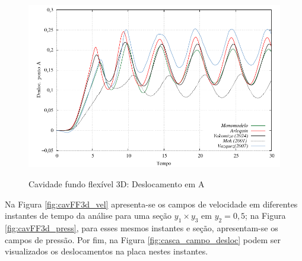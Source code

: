 \begin{figure}[H]
	\caption{Cavidade fundo flexível 3D: Deslocamento em A}
	\centering 
	\includegraphics[scale=0.75,trim=0cm 0cm 0cm 0cm, clip=true]{Imagens/Cap7/cavFF3d_deslA.pdf}	
	\label{fig:cavFF3d_deslA}
\end{figure}

Na Figura \ref{fig:cavFF3d_vel} apresenta-se os campos de velocidade em diferentes instantes de tempo da análise para uma seção $y_1 \times y_3$ em $y_2=0,5$; na Figura \ref{fig:cavFF3d_press}, para esses mesmos instantes e seção, apresentam-se os campos de pressão. Por fim, na Figura \ref{fig:casca_campo_desloc} podem ser visualizados os deslocamentos na placa nestes instantes.

